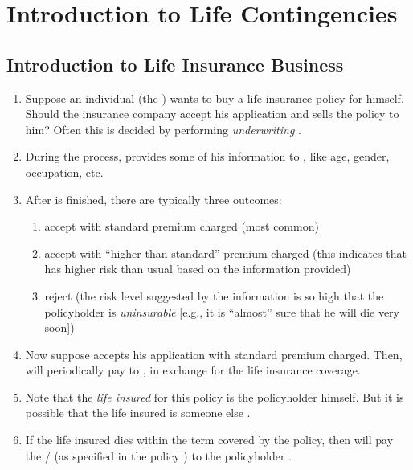 \section{Introduction to Life Contingencies}
\subsection{Introduction to Life Insurance Business}
\begin{enumerate}
\item Suppose an individual  (the ) wants to buy
a life insurance policy for himself.  Should the insurance company
 accept his application and sells the policy 
to him? Often this is decided by performing \emph{underwriting} .

\item During the   process,  provides some of his
information to , like age, gender, occupation, etc.

\item After  is finished, there are typically three outcomes:
\begin{enumerate}

\item accept with standard premium charged (most common)

\item accept with ``higher than standard'' premium charged (this indicates that
 has higher risk than usual based on the information provided)

\item reject (the risk level suggested by the information is so high that the
policyholder is \emph{uninsurable} [e.g., it is ``almost'' sure that he will
die very soon])
\end{enumerate}

\item Now suppose  accepts his application with standard premium
charged. Then,  will periodically pay  
to , in exchange for the life insurance coverage.

\item Note that the \emph{life insured} for this policy is the policyholder
 himself. But it is possible that the life insured is someone else
.

\item If the life insured  dies within the term covered by the
policy, then  will pay the /  (as specified in the policy
) to the policyholder .


\end{enumerate}
